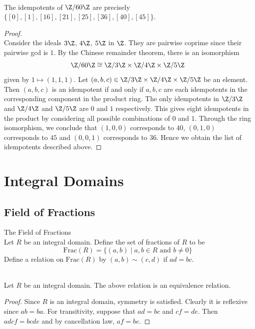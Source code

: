 \documentclass[a4paper]{article}
\begin{document}
\begin{eg}{}{}\\
The idempotents of $\Z/60\Z$ are precisely $\{[0],[1],[16],[21],[25],[36],[40],[45]\}$. 
\begin{proof}\\
Consider the ideals $3\Z$, $4\Z$, $5\Z$ in $\Z$. They are pairwise coprime since their pairwise gcd is $1$. By the Chinese remainder theorem, there is an isomorphism $$\Z/60\Z\cong\Z/3\Z\times\Z/4\Z\times\Z/5\Z$$ given by $1\mapsto(1,1,1)$. Let $(a,b,c)\in\Z/3\Z\times\Z/4\Z\times\Z/5\Z$ be an element. Then $(a,b,c)$ is an idempotent if and only if $a,b,c$ are each idempotents in the corresponding component in the product ring. The only idempotents in $\Z/3\Z$ and $\Z/4\Z$ and $\Z/5\Z$ are $0$ and $1$ respectively. This gives eight idempotents in the product by considering all possible combinations of $0$ and $1$. Through the ring isomorphism, we conclude that $(1,0,0)$ corresponds to $40$, $(0,1,0)$ corresponds to $45$ and $(0,0,1)$ corresponds to $36$. Hence we obtain the list of idempotents described above. 
\end{proof}
\end{eg}

\pagebreak
\section{Integral Domains}
\subsection{Field of Fractions}
\begin{defn}{The Field of Fractions}{}\\
Let $R$ be an integral domain. Define the set of fractions of $R$ to be $$\text{Frac}(R)=\{(a,b)\;|\;a,b\in R\text{ and }b\neq 0\}$$ Define a relation on $\text{Frac}(R)$ by $(a,b)\sim(c,d)$ if $ad=bc$. 
\end{defn}

\begin{lmm}{}{}\\
Let $R$ be an integral domain. The above relation is an equivalence relation. 
\begin{proof}
Since $R$ is an integral domain, symmetry is satisfied. Clearly it is reflexive since $ab=ba$. For transitivity, suppose that $ad=bc$ and $cf=de$. Then $adcf=bcde$ and by cancellation law, $af=be$. 
\end{proof}
\end{lmm}
\end{document}

